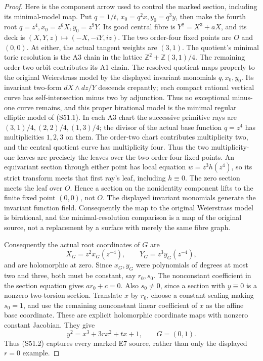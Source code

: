 \begin{proof}
Here is the component arrow used to control the marked section,
including its minimal-model map. Put \(q=1/t\),
\(x_0=q^2x,y_0=q^3y\), then make the fourth root
\(q=z^4,x_0=z^6X,y_0=z^9Y\). Its good central fibre is
\(Y^2=X^3+aX\), and its deck is
\((X,Y,z)\mapsto(-X,-iY,iz)\). The two order-four fixed points
are \(O\) and \((0,0)\). At either, the actual tangent weights
are \((3,1)\). The quotient's minimal toric resolution is the
A3 chain in the lattice
\(\mathbb Z^2+\mathbb Z(3,1)/4\). The remaining order-two
orbit contributes its A1 chain. The resolved quotient maps
properly to the original Weierstrass model by the displayed
invariant monomials \(q,x_0,y_0\). Its invariant two-form
\(dX\wedge dz/Y\) descends crepantly; each compact rational
vertical curve has self-intersection minus two by adjunction.
Thus no exceptional minus-one curve remains, and this proper
birational model is the minimal regular elliptic model of
(S51.1). In each A3 chart the successive primitive rays are
\((3,1)/4,(2,2)/4,(1,3)/4\); the divisor of the actual base
function \(q=z^4\) has multiplicities \(1,2,3\) on them.
The order-two chart contributes multiplicity two, and the
central quotient curve has multiplicity four. Thus the two
multiplicity-one leaves are precisely the leaves over the two
order-four fixed points. An equivariant section through either
point has local equation \(w=z^3h(z^4)\), so its strict transform
meets that first ray's leaf, including \(h\equiv0\). The zero
section meets the leaf over \(O\). Hence a section on the
nonidentity component lifts to the finite fixed point \((0,0)\),
not \(O\). The displayed invariant monomials generate the
invariant function field. Consequently the map to the original
Weierstrass model is birational, and the minimal-resolution
comparison is a map of the original source, not a replacement
by a surface with merely the same fibre graph.

Consequently the actual root coordinates of \(G\) are
\[
              X_G=z^2x_G(z^{-4}),\qquad
              Y_G=z^3y_G(z^{-4}),
\]
and are holomorphic at zero. Since \(x_G,y_G\) were polynomials
of degrees at most two and three, both must be constant,
say \(r_0,s_0\). The nonconstant coefficient in the section
equation gives \(a r_0+c=0\). Also \(s_0\ne0\), since a
section with \(y\equiv0\) is a nonzero two-torsion section.
Translate \(x\) by \(r_0\), choose a constant scaling making
\(s_0=1\), and use the remaining nonconstant linear coefficient
of \(x\) as the affine base coordinate. These are explicit
holomorphic coordinate maps with nonzero constant Jacobian.
They give
\[
                  y^2=x^3+3r x^2+t x+1,\qquad G=(0,1).
 \tag{S51.2}
\]
Thus (S51.2) captures every marked E7 source, rather than only
the displayed \(r=0\) example.


\end{proof}
